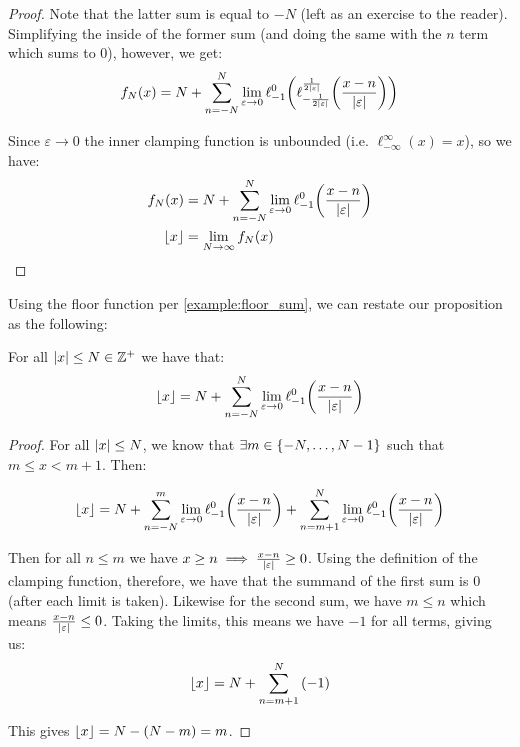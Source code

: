 \begin{example}
\begin{proof}
        Note that the latter sum is equal to $-N$ (left as an exercise to the reader). Simplifying the inside of the former sum (and doing the same with the $n$ term which sums to $0$), however, we get:
        $$
            f_N(x) = N+\sum_{n=-N}^{N}{\lim_{\varepsilon\to0}{\ell_{-1}^{0}\paren*{\ell_{-\frac{1}{2\abs{\varepsilon}}}^{\frac{1}{2\abs{\varepsilon}}}\paren*{\frac{x-n}{\abs{\varepsilon}}}}}}
        $$

        Since $\varepsilon\to 0$ the inner clamping function is unbounded (i.e. $\ell_{-\infty}^{\infty}(x)=x$), so we have:
        \begin{align*}
            f_N(x) &= N+\sum_{n=-N}^{N}{\lim_{\varepsilon\to0}{\ell_{-1}^{0}\paren*{\frac{x-n}{\abs{\varepsilon}}}}}\\
            \floor{x} &= \lim_{N\to\infty}{f_N(x)}
        \end{align*}
    \end{proof}
\end{example}

\begin{theorem}
    Using the floor function per \autoref{example:floor_sum}, we can restate our proposition as the following:

    For all $\abs{x}\leq N\in\mathbb{Z}^+$ we have that:
    $$
        \floor{x} = N+\sum_{n=-N}^{N}{\lim_{\varepsilon\to0}{\ell_{-1}^{0}\paren*{\frac{x-n}{\abs{\varepsilon}}}}}
    $$

    \begin{proof}
        For all $\abs{x}\leq N$, we know that $\exists m\in\{-N,\dots,N-1\}$ such that $m\leq x< m+1$. Then:

        $$
            \floor{x} = N+\sum_{n=-N}^{m}{\lim_{\varepsilon\to0}{\ell_{-1}^{0}\paren*{\frac{x-n}{\abs{\varepsilon}}}}}+\sum_{n=m+1}^{N}{\lim_{\varepsilon\to0}{\ell_{-1}^{0}\paren*{\frac{x-n}{\abs{\varepsilon}}}}}
        $$

        Then for all $n\leq m$ we have $x\geq n\implies\frac{x-n}{\abs{\varepsilon}}\geq 0$. Using the definition of the clamping function, therefore, we have that the summand of the first sum is 0 (after each limit is taken). Likewise for the second sum, we have $m\leq n$ which means $\frac{x-n}{\abs{\varepsilon}}\leq 0$. Taking the limits, this means we have $-1$ for all terms, giving us:
        $$
            \lfloor x\rfloor = N+\sum_{n=m+1}^{N}{(-1)}
        $$

        This gives $\lfloor x\rfloor=N-(N-m)=m$.
    \end{proof}
\end{theorem}

